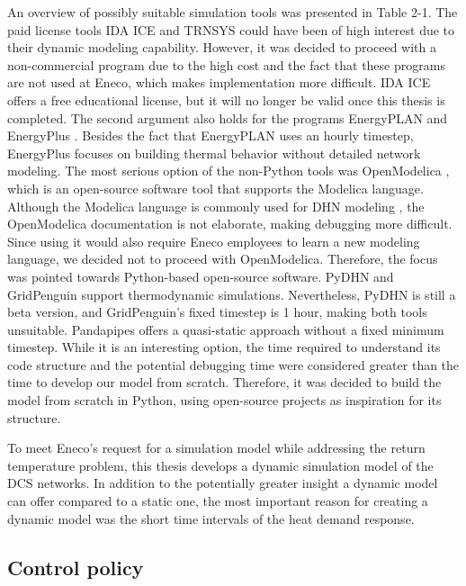 An overview of possibly suitable simulation tools was presented in Table 2-1. The paid license tools IDA ICE and TRNSYS could have been of high interest due to their dynamic modeling capability. However, it was decided to proceed with a non-commercial program due to the high cost and the fact that these programs are not used at Eneco, which makes implementation more difficult. IDA ICE offers a free educational license, but it will no longer be valid once this thesis is completed. The second argument also holds for the programs EnergyPLAN \cite{EnergyPlan} and EnergyPlus \cite{EnergyPlus}. Besides the fact that EnergyPLAN uses an hourly timestep, EnergyPlus focuses on building thermal behavior without detailed network modeling. The most serious option of the non-Python tools was OpenModelica \cite{OpenModelica}, which is an open-source software tool that supports the Modelica language. Although the Modelica language is commonly used for DHN modeling \cite{KUNTUAROVA}, the OpenModelica documentation is not elaborate, making debugging more difficult. Since using it would also require Eneco employees to learn a new modeling language, we decided not to proceed with OpenModelica. Therefore, the focus was pointed towards Python-based open-source software. PyDHN \cite{PyDHN} and GridPenguin \cite{GridPenguin} support thermodynamic simulations. Nevertheless, PyDHN is still a beta version, and GridPenguin’s fixed timestep is 1 hour, making both tools unsuitable. Pandapipes \cite{pandapipes} offers a quasi-static approach without a fixed minimum timestep. While it is an interesting option, the time required to understand its code structure and the potential debugging time were considered greater than the time to develop our model from scratch. Therefore, it was decided to build the model from scratch in Python, using open-source projects as inspiration for its structure.

To meet Eneco's request for a simulation model while addressing the return temperature problem, this thesis develops a dynamic simulation model of the DCS networks. In addition to the potentially greater insight a dynamic model can offer compared to a static one, the most important reason for creating a dynamic model was the short time intervals of the heat demand response.

\subsection{Control policy}
